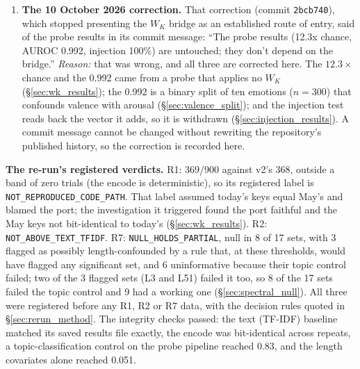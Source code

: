 \begin{enumerate}[leftmargin=*]
\begin{itemize}[nosep]
    \end{itemize}
    \item \label{app:item:untouched}\textbf{The 10 October 2026 correction.} That correction (commit \texttt{2bcb740}), which stopped presenting the $W_K$ bridge as an established route of entry, said of the probe results in its commit message: ``The probe results (12.3x chance, AUROC 0.992, injection 100\%) are untouched; they don't depend on the bridge.'' \emph{Reason:} that was wrong, and all three are corrected here. The $12.3\times$ chance and the 0.992 came from a probe that applies no $W_K$ (\S\ref{sec:wk_results}); the 0.992 is a binary split of ten emotions ($n = 300$) that confounds valence with arousal (\S\ref{sec:valence_split}); and the injection test reads back the vector it adds, so it is withdrawn (\S\ref{sec:injection_results}). A commit message cannot be changed without rewriting the repository's published history, so the correction is recorded here.
\end{enumerate}

\textbf{The re-run's registered verdicts.} R1: 369/900 against v2's 368, outside a band of zero trials (the encode is deterministic), so its registered label is \texttt{NOT\_REPRODUCED\_CODE\_PATH}. That label assumed today's keys equal May's and blamed the port; the investigation it triggered found the port faithful and the May keys not bit-identical to today's (\S\ref{sec:wk_results}). R2: \texttt{NOT\_ABOVE\_TEXT\_TFIDF}. R7: \texttt{NULL\_HOLDS\_PARTIAL}, null in 8 of 17 sets, with 3 flagged as possibly length-confounded by a rule that, at these thresholds, would have flagged any significant set, and 6 uninformative because their topic control failed; two of the 3 flagged sets (L3 and L51) failed it too, so 8 of the 17 sets failed the topic control and 9 had a working one (\S\ref{sec:spectral_null}). All three were registered before any R1, R2 or R7 data, with the decision rules quoted in \S\ref{sec:rerun_method}. The integrity checks passed: the text (TF-IDF) baseline matched its saved results file exactly, the encode was bit-identical across repeats, a topic-classification control on the probe pipeline reached 0.83, and the length covariates alone reached 0.051.


